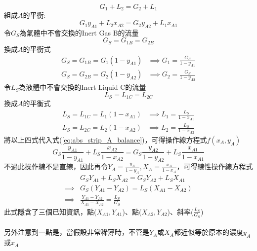 \documentclass[../main.tex]{subfiles}
\begin{document}
\begin{itemize}
\begin{itemize}
\begin{equation}
        G_1 + L_2 = G_2 + L_1
      \end{equation}
      組成$A$的平衡:
      \begin{equation}
        G_1y_{A1} + L_2x_{A2} = G_2y_{A2} + L_1x_{A1} \label{eq:abs_strip_A_balance}
      \end{equation}
      令$G_S$為氣體中不會交換的Inert Gas B的流量
      \begin{equation}
        G_S = G_{1B} = G_{2B}
      \end{equation}
      換成$A$的平衡式
      \begin{align}
        G_S = G_{1B} = G_1(1-y_{A1}) &\implies G_1 = \frac{G_S}{1-y_{A1}} \\
        G_S = G_{2B} = G_2(1-y_{A2}) &\implies G_2 = \frac{G_S}{1-y_{A2}}
      \end{align}
      令$L_S$為液體中不會交換的Inert Liquid C的流量
      \begin{equation}
        L_S = L_{1C} = L_{2C}
      \end{equation}
      換成$A$的平衡式
      \begin{align}
        L_S = L_{1C} = L_1(1-x_{A1}) &\implies L_1 = \frac{L_S}{1-x_{A1}} \\
        L_S = L_{2C} = L_2(1-x_{A2}) &\implies L_2 = \frac{L_S}{1-x_{A2}}
      \end{align}
      將以上四式代入式(\ref{eq:abs_strip_A_balance})，可得操作線方程式$f(x_A,y_A)$
      \begin{equation}
        \boxed{
          G_S\frac{y_{A1}}{1-y_{A1}} + L_S\frac{x_{A2}}{1-x_{A2}} = G_S\frac{y_{A2}}{1-y_{A2}} + L_S\frac{x_{A1}}{1-x_{A1}}
        }
      \end{equation}
      不過此操作線不是直線，因此再令$Y_A = \frac{y_A}{1-y_A}, X_A = \frac{x_A}{1-x_A}$，可得線性操作線方程式
      \begin{align}
        &\boxed{G_SY_{A1}+ L_SX_{A2} = G_SY_{A2} + L_SX_{A1}} \nonumber \\
        \implies &\boxed{G_S(Y_{A1}-Y_{A2}) = L_S(X_{A1}-X_{A2})}\nonumber \\
        \implies &\boxed{\frac{Y_{A1}-Y_{A2}}{X_{A1}-X_{A2}} = \frac{L_S}{G_S}}
      \end{align}
      此式隱含了三個已知資訊，點($X_{A1}, Y_{A1}$)、點($X_{A2}, Y_{A2}$)、斜率($\frac{L_S}{G_S}$)\\
      \\
      另外注意到一點是，當假設非常稀薄時，不管是$Y_A$或$X_A$都近似等於原本的濃度$y_A$或$x_A$

\end{itemize}
\end{itemize}
\end{document}
